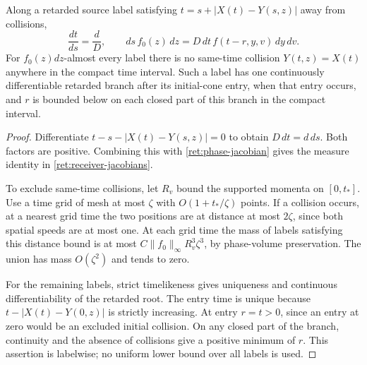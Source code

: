 \begin{lemma}\label{ret:receiver-time}
Along a retarded source label satisfying
$t=s+|X(t)-Y(s,z)|$ away from collisions,
\begin{equation}\label{ret:receiver-jacobians}
 \frac{dt}{ds}=\frac dD,\qquad
 ds\,f_0(z)\,dz=D\,dt\,f(t-r,y,v)\,dy\,dv.
\end{equation}
For $f_0(z)dz$-almost every label there is no same-time collision
$Y(t,z)=X(t)$ anywhere in the compact time interval. Such a label has
one continuously differentiable retarded branch after its initial-cone entry, when that
entry occurs, and $r$ is bounded below on each closed part of this
branch in the compact interval.
\end{lemma}

\begin{proof}
Differentiate $t-s-|X(t)-Y(s,z)|=0$ to obtain $D\,dt=d\,ds$.
Both factors are positive. Combining this with
\eqref{ret:phase-jacobian} gives the measure identity in
\eqref{ret:receiver-jacobians}.

To exclude same-time collisions, let $R_v$ bound the supported momenta
on $[0,t_*]$. Use a time grid of mesh at most $\zeta$ with
$O(1+t_*/\zeta)$ points. If a collision occurs, at a nearest grid time
the two positions are at distance at most $2\zeta$, since both spatial
speeds are at most one. At each grid time the mass of labels satisfying
this distance bound is at most
$C\|f_0\|_\infty R_v^3\zeta^3$, by phase-volume preservation.
The union has mass $O(\zeta^2)$ and tends to zero.

For the remaining labels, strict timelikeness gives uniqueness and
continuous differentiability of the retarded root. The entry time is unique because
$t-|X(t)-Y(0,z)|$ is strictly increasing. At entry $r=t>0$, since
an entry at zero would be an excluded initial collision. On any
closed part of the branch, continuity and the absence of collisions
give a positive minimum of $r$. This assertion is labelwise; no
uniform lower bound over all labels is used.
\end{proof}
